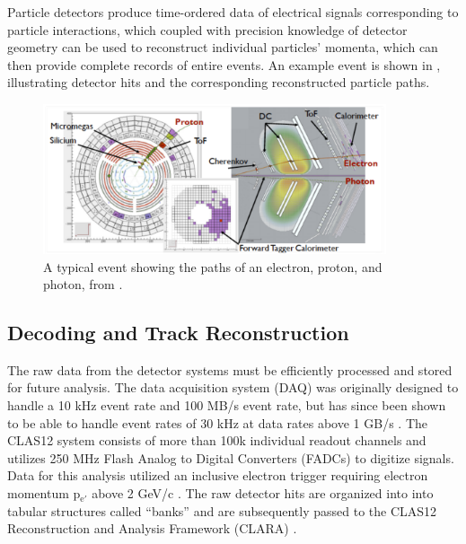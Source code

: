 Particle detectors produce time-ordered data of electrical signals corresponding to particle interactions, which coupled with precision knowledge of detector geometry can be used to reconstruct individual particles' momenta, which can then provide complete records of entire events. An example event is shown in , illustrating detector hits and the corresponding reconstructed particle paths.

\begin{figure}[htb]
    \centering
    \includegraphics[width=0.9\textwidth]{Chapters/Ch2-Experiment/recon_pid/pid_figs/example_track.png}
    \caption[Example Event Tracks]{A typical event showing the paths of an electron, proton, and photon, from \parencite{Battaglieri2021PresentProgram}.}
    \label{fig:example-track}
\end{figure}


\subsection{Decoding and Track Reconstruction}\label{sec:decoding_reconstruction}
    The raw data from the detector systems must be efficiently processed and stored for future analysis. The data acquisition system (DAQ) was originally designed to handle a 10 kHz event rate and 100 MB/s event rate, but has since been shown to be able to handle event rates of 30 kHz at data rates above 1 GB/s \parencite{Boyarinov2020TheSystem}.  The CLAS12 system consists of more than 100k individual readout channels and utilizes 250 MHz Flash Analog to Digital Converters (FADCs) to digitize signals. Data for this analysis utilized an inclusive electron trigger requiring electron momentum p$_{\mathrm{e'}}$ above 2 GeV/c \parencite{Raydo2020TheSystem}. The raw detector hits are organized into into tabular structures called ``banks'' and are subsequently passed to the CLAS12 Reconstruction and Analysis Framework (CLARA) \parencite{Gyurgyan2016CLARA:Framework}.

